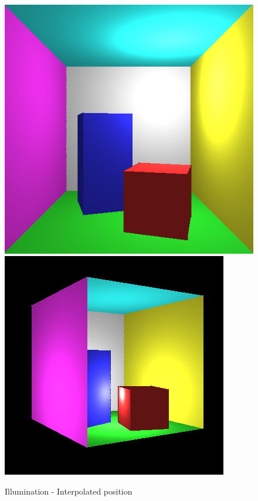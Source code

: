 \begin{figure}[H]
\endminipage
{}
    \centering
    \includegraphics[width=\linewidth]{img/final3.jpg}
\endminipage
{}
    \centering
    \includegraphics[width=\linewidth]{img/final4.jpg}
\endminipage
\caption{Illumination - Interpolated position}
\end{figure}

